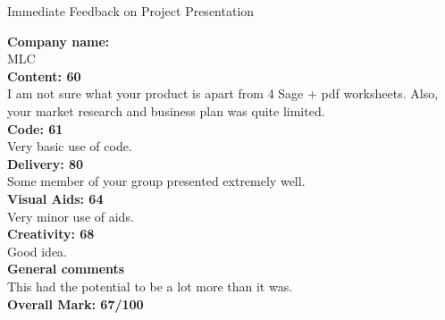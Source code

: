 \documentclass{article}
\begin{document}
\begin{center}
\Huge{Immediate Feedback on Project Presentation}\\
\end{center}


\normalsize
\textbf{Company name:}\\

MLC \\

\textbf{Content: 60}\\

I am not sure what your product is apart from 4 Sage + pdf worksheets.
Also, your market research and business plan was quite limited.\\

\textbf{Code: 61}\\

Very basic use of code.\\

\textbf{Delivery: 80}\\

Some member of your group presented extremely well.\\

\textbf{Visual Aids: 64}\\

Very minor use of aids.\\

\textbf{Creativity: 68}\\

Good idea.\\

\textbf{General comments}\\

This had the potential to be a lot more than it was.\\

\textbf{Overall Mark: 67/100}
\end{document}
